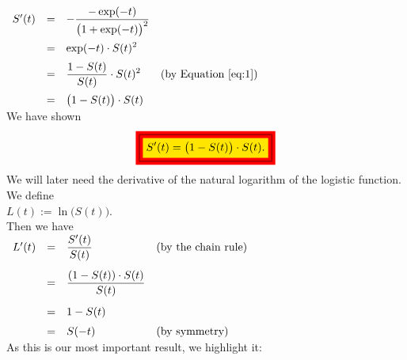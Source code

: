 $
\begin{array}{lcll}
 S'(t) & = & \displaystyle -\frac{-\exp(-t)}{\bigr(1+\exp(-t)\bigr)^2}   \\[0.5cm]
       & = & \displaystyle \exp(-t) \cdot S(t)^2                         \\[0.2cm]
       & = & \displaystyle \frac{1-S(t)}{S(t)} \cdot S(t)^2  & \mbox{(by Equation \ref{eq:1})} \\[0.4cm]
       & = & \displaystyle \bigl(1 - S(t)\bigr) \cdot S(t)            
\end{array}
$
\\[0.2cm]
We have shown
\begin{equation}
  \label{eq:2}
  \colorbox{red}{\framebox{\colorbox{orange}{\mbox{$\ds S'(t) = \bigl(1 - S(t)\bigr) \cdot S(t)$.}}}}
\end{equation}
We will later need the derivative of the natural logarithm of the logistic function.  We define
\\[0.2cm]
\hspace*{1.3cm}
$L(t) := \ln\bigl(S(t)\bigr)$.
\\[0.2cm]
Then we have
\\[0.2cm]
\hspace*{1.3cm}
$
\begin{array}{lcll}
  L'(t) & = & \displaystyle \frac{S'(t)}{S(t)}                  & \mbox{(by the chain rule)} \\[0.5cm]
        & = & \displaystyle \frac{(1 - S(t)) \cdot S(t)}{S(t)}                               \\[0.5cm]
        & = & \displaystyle 1 - S(t)                                                         \\[0.2cm]
        & = & \displaystyle S(-t)                               & \mbox{(by symmetry)} 
\end{array}
$
\\[0.2cm]
As this is our most important result, we highlight it:
\\[0.2cm]
\hspace*{1.3cm}
\colorbox{red}{}


